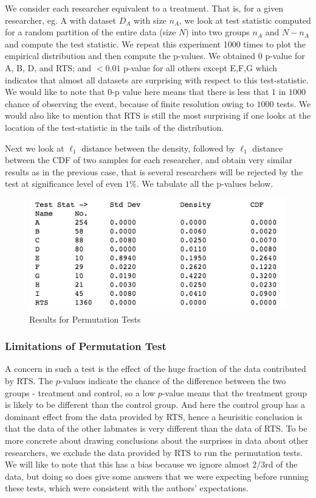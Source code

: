 \documentclass{article}
\begin{document}
We consider each researcher equivalent to a treatment. That is, for a
given researcher, eg. A with dataset \(D_A\) with size \(n_A\), we look
at test statistic computed for a random partition of the entire data
(size \(N\)) into two groups \(n_A\) and \(N-n_A\) and compute the test
statistic. We repeat this experiment 1000 times to plot the empirical
distribution and then compute the p-values. We obtained 0 p-value for A, B,
D, and RTS; and \(<0.01\) p-value for all others except E,F,G which
indicates that almost all datasets are surprising with respect to this
test-statistic. We would like to note that $0$-p value here means that there is less that $1$ in $1000$ chance of observing the event, because of finite resolution owing to $1000$ tests. We would also like to mention that RTS is still the most surprising if one looks at the location of the test-statistic in the
tails of the distribution.

Next we look at \(\ell_1\) distance between the density, followed by
\(\ell_1\) distance between the CDF of two samples for each researcher,
and obtain very similar results as in the previous case, that is several
researchers will be rejected by the test at significance level of even
\(1 \%\). We tabulate all the p-values below.

\begin{figure}[htbp]
\centering
\includegraphics[width=0.8\linewidth]{images/mid_ratio_perm.png}
\caption{Results for Permutation Tests}
\end{figure}

\subsubsection{Limitations of Permutation Test} %
\label{ssub:limitations_of_permutation_test}

A concern in such a test is the effect of the huge fraction of the data
contributed by RTS. The $p$-values indicate the chance of the difference
between the two groups - treatment and control, so a low $p$-value means
that the treatment group is likely to be different than the control
group. And here the control group has a dominant effect from the data
provided by RTS, hence a heurisitic conclusion is that the data of the
other labmates is very different than the data of RTS. To be more
concrete about drawing conclusions about the surprises in data about
other researchers, we exclude the data provided by RTS to run the
permutation tests. We will like to note that this has a bias because we
ignore almost 2/3rd of the data, but doing so does give some answers
that we were expecting before running these tests, which were consistent with the authors' expectations.
\end{document}
